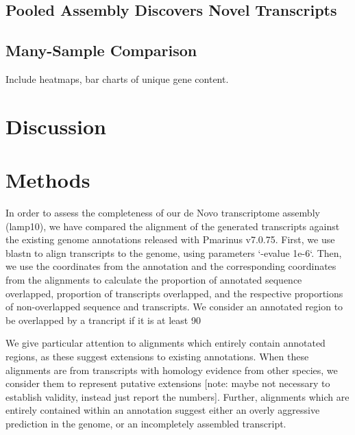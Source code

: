 \documentclass{article}
\begin{document}
\subsection*{Pooled Assembly Discovers Novel Transcripts}

\subsection*{Many-Sample Comparison}

Include heatmaps, bar charts of unique gene content.

\section*{Discussion}

\section*{Methods}


In order to assess the completeness of our de Novo transcriptome assembly (lamp10), we have compared the alignment of the generated transcripts against the existing genome annotations released with Pmarinus v7.0.75. First, we use blastn to align transcripts to the genome, using parameters `-evalue 1e-6`. Then, we use the coordinates from the annotation and the corresponding coordinates from the alignments to calculate the proportion of annotated sequence overlapped, proportion of transcripts overlapped, and the respective proportions of non-overlapped sequence and transcripts. We consider an annotated region to be overlapped by a trancript if it is at least 90%

We give particular attention to alignments which entirely contain annotated regions, as these suggest extensions to existing annotations. When these alignments are from transcripts with homology evidence from other species, we consider them to represent putative extensions [note: maybe not necessary to establish validity, instead just report the numbers]. Further, alignments which are entirely contained within an annotation suggest either an overly aggressive prediction in the genome, or an incompletely assembled transcript. 
\end{document}
